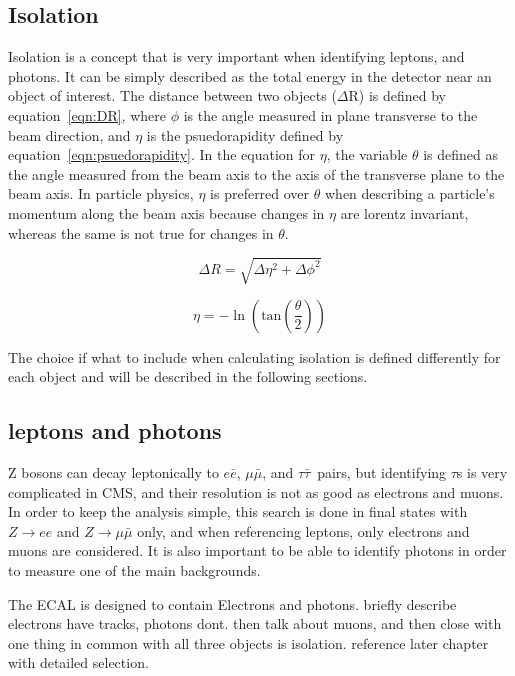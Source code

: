 \subsection{Isolation}
Isolation is a concept that is very important when identifying leptons, and photons.
It can be simply described as the total energy in the detector near an object of interest.
The distance between two objects ($\Delta$R) is defined by equation~\ref{eqn:DR},
where $\phi$ is the angle measured in plane transverse to the beam direction,
and $\eta$ is the psuedorapidity defined by equation~\ref{eqn:psuedorapidity}.
In the equation for $\eta$, the variable $\theta$ is defined as the angle measured from the beam axis to the axis of the transverse plane to the beam axis.
In particle physics, $\eta$ is preferred over $\theta$ when describing a particle's momentum along the beam axis because changes in $\eta$ are lorentz invariant,
whereas the same is not true for changes in $\theta$.

\begin{equation}
  \label{eqn:DR}
  \Delta R = \sqrt{\Delta\eta^{2}+\Delta\phi^{2}}
\end{equation}

\begin{equation}
  \label{eqn:psuedorapidity}
  \eta = -\ln(\mathrm{tan}(\frac{\theta}{2}))
\end{equation}

The choice if what to include when calculating isolation is defined differently for each object and will be described in the following sections.

\subsection{leptons and photons}
\label{ssec:lepsandphots}
Z bosons can decay leptonically to $e\bar{e}$, $\mu\bar{\mu}$, and $\tau\bar{\tau}$~pairs,
but identifying $\tau$s is very complicated in CMS, and their resolution is not as good as electrons and muons.
In order to keep the analysis simple, this search is done in final states with $Z\rightarrow ee$ and $Z\rightarrow\mu\bar{\mu}$ only,
and when referencing leptons, only electrons and muons are considered.
It is also important to be able to identify photons in order to measure one of the main backgrounds.

The ECAL is designed to contain Electrons and photons.
briefly describe electrons have tracks, photons dont.
then talk about muons, and then close with one thing in common with all three objects is isolation.
reference later chapter with detailed selection.

